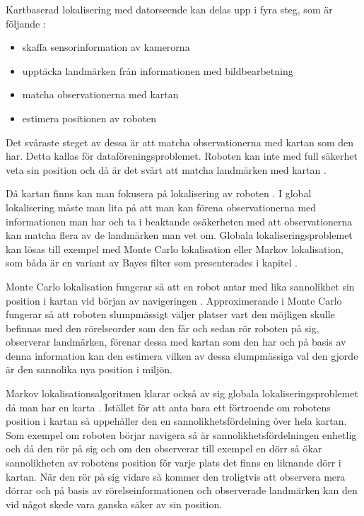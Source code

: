 Kartbaserad lokalisering med datorseende kan delas upp i fyra steg, som är följande \citep{982903}:

\begin{itemize}
    \item skaffa sensorinformation av kamerorna
    \item upptäcka landmärken från informationen med bildbearbetning
    \item matcha observationerna med kartan
    \item estimera positionen av roboten
\end{itemize}

Det svåraste steget av dessa är att matcha observationerna med kartan som den har. Detta kallas för dataföreningsproblemet. Roboten kan inte med full säkerhet veta sin position och då är det svårt att matcha landmärken med kartan \citep{982903}.

Då kartan finns kan man fokusera på lokalisering av roboten \citep{982903}. I global lokalisering måste man lita på att man kan förena observationerna med informationen man har och ta i beaktande osäkerheten med att observationerna kan matcha flera av de landmärken man vet om. Globala lokaliseringsproblemet kan lösas till exempel med Monte Carlo lokalisation eller Markov lokalisation, som båda är en variant av Bayes filter som presenterades i kapitel  \citep{ProbabilisticRobotics}. 

Monte Carlo lokalisation fungerar så att en robot antar med lika sannolikhet sin position i kartan vid början av navigeringen \citep{montecarlo}. Approximerande i Monte Carlo fungerar så att roboten slumpmässigt väljer platser vart den möjligen skulle befinnas med den rörelseorder som den får och sedan rör roboten på sig, observerar landmärken, förenar dessa med kartan som den har och på basis av denna information kan den estimera vilken av dessa slumpmässiga val den gjorde är den sannolika nya position i miljön. 

Markov lokalisationsalgoritmen klarar också av sig globala lokaliseringsproblemet då man har en karta \citep{ProbabilisticRobotics}. Istället för att anta bara ett förtroende om robotens position i kartan så uppehåller den en sannolikhetsfördelning över hela kartan. Som exempel om roboten börjar navigera så är sannolikhetsfördelningen enhetlig och då den rör på sig och om den observerar till exempel en dörr så ökar sannolikheten av robotens position för varje plats det finns en liknande dörr i kartan. När den rör på sig vidare så kommer den troligtvis att observera mera dörrar och på basis av rörelseinformationen och observerade landmärken kan den vid något skede vara ganska säker av sin position.

